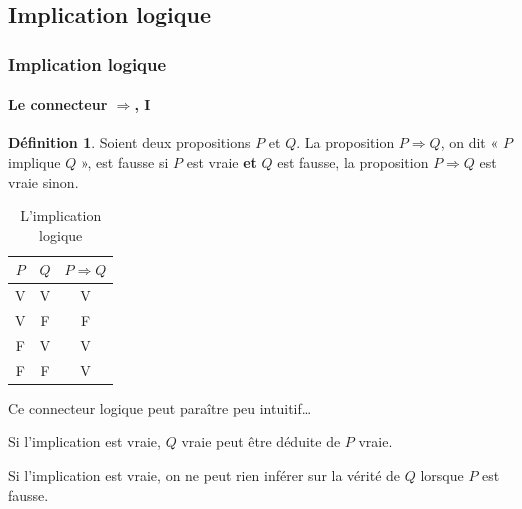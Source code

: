 \documentclass[10pt,notheorems]{beamer}
\theoremstyle{plain}
\theoremstyle{definition} %
\newtheorem{definition}{Définition}
\begin{document}
\subsection{Implication logique}

\begin{frame}
  \frametitle{Implication logique}
  \framesubtitle{Le connecteur $\Rightarrow$, I}
  \hypertarget{slide_implication_1}{}
  \begin{definition}

    Soient deux propositions $P$ et $Q$. La proposition
    $P\Rightarrow Q$, on dit « $P$ implique $Q$ », est fausse si $P$
    est vraie \textbf{et} $Q$ est fausse, la proposition
    $P\Rightarrow Q$ est vraie sinon.
  \end{definition}


  \begin{table}[H]

    \centering
    \begin{tabular}[H]{|cc|c|}
      \hline
      $P$ & $Q$ & $P \Rightarrow Q$\\ \hline
      V & V & V \\
      V & F & F \\
      F & V & V \\
      F & F & V \\
      \hline\hline
    \end{tabular}
    \caption{L'implication logique}
    \label{tab:implication}
  \end{table}

  Ce connecteur logique peut paraître peu intuitif\ldots\newline

  Si l'implication est vraie, $Q$ vraie peut être déduite de $P$ vraie.\newline

  Si l'implication est vraie, on ne peut rien inférer sur la vérité de $Q$ lorsque $P$ est fausse.\newline

\end{frame}
\end{document}
